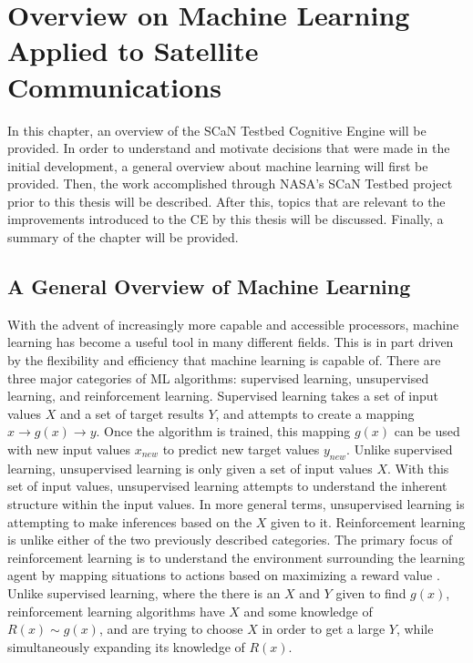 
%	
	\chapter{Overview on Machine Learning Applied to Satellite Communications}
		\par In this chapter, an overview of the SCaN Testbed Cognitive Engine will be provided. In order to understand and motivate decisions that were made in the initial development, a general overview about machine learning will first be provided. Then, the work accomplished through NASA's SCaN Testbed project prior to this thesis will be described. After this, topics that are relevant to the improvements introduced to the CE by this thesis will be discussed. Finally, a summary of the chapter will be provided.
	\section{A General Overview of Machine Learning}\label{bg:introToML}
	\par With the advent of increasingly more capable and accessible processors, machine learning has become a useful tool in many different fields. This is in part driven by the flexibility and efficiency that machine learning is capable of. There are three major categories of ML algorithms\cite{introToML}: supervised learning, unsupervised learning, and reinforcement learning. Supervised learning takes a set of input values $X$ and a set of target results $Y$, and attempts to create a mapping $x \to g(x)\to y$. Once the algorithm is trained, this mapping $g(x)$ can be used with new input values $x_{new}$ to predict new target values $y_{new}$. Unlike supervised learning, unsupervised learning is only given a set of input values $X$. With this set of input values, unsupervised learning attempts to understand the inherent structure within the input values\cite{placeholderCitation}. In more general terms, unsupervised learning is attempting to make inferences based on the $X$ given to it. Reinforcement learning is unlike either of the two previously described categories. The primary focus of reinforcement learning is to understand the environment surrounding the learning agent by mapping situations to actions based on maximizing a reward value \cite{rl_intro}. Unlike supervised learning, where the there is an $X$ and $Y$ given to find $g(x)$, reinforcement learning algorithms have $X$ and some knowledge of $R(x)\sim g(x)$, and are trying to choose $X$ in order to get a large $Y$, while simultaneously expanding its knowledge of $R(x)$. 
	
